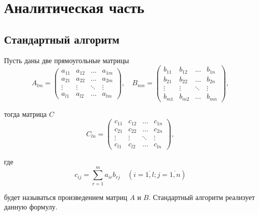 \chapter{Аналитическая часть}

\section{Стандартный алгоритм}

Пусть даны две прямоугольные матрицы
\begin{equation}
    A_{lm} = \begin{pmatrix}
                 a_{11} & a_{12} & \ldots & a_{1m}\\
                 a_{21} & a_{22} & \ldots & a_{2m}\\
                 \vdots & \vdots & \ddots & \vdots\\
                 a_{l1} & a_{l2} & \ldots & a_{lm}
    \end{pmatrix},
    \quad
    B_{mn} = \begin{pmatrix}
                 b_{11} & b_{12} & \ldots & b_{1n}\\
                 b_{21} & b_{22} & \ldots & b_{2n}\\
                 \vdots & \vdots & \ddots & \vdots\\
                 b_{m1} & b_{m2} & \ldots & b_{mn}
    \end{pmatrix},
\end{equation}


тогда матрица $C$
\begin{equation}
    C_{ln} = \begin{pmatrix}
                 c_{11} & c_{12} & \ldots & c_{1n}\\
                 c_{21} & c_{22} & \ldots & c_{2n}\\
                 \vdots & \vdots & \ddots & \vdots\\
                 c_{l1} & c_{l2} & \ldots & c_{ln}
    \end{pmatrix},
\end{equation}

где
\begin{equation}
    \label{eq:M}
    c_{ij} =
    \sum_{r=1}^{m} a_{ir}b_{rj} \quad (i=\overline{1,l}; j=\overline{1,n})
\end{equation}

будет называться произведением матриц $A$ и $B$.
Стандартный алгоритм реализует данную формулу.

